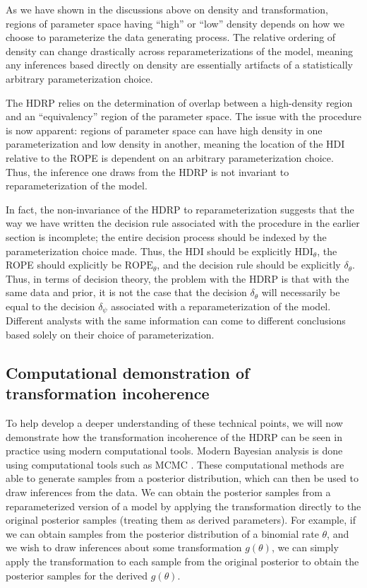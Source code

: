 \documentclass[man]{apa}
\newcommand{\hdr}{HDRP}
\begin{document}
As we have shown in the discussions above on density and transformation, regions of parameter space having ``high'' or ``low'' density depends on how we choose to parameterize the data generating process. The relative ordering of density can change drastically across reparameterizations of the model, meaning any inferences based directly on density are essentially artifacts of a statistically arbitrary parameterization choice. 

The \hdr{} relies on the determination of overlap between a high-density region and an ``equivalency'' region of the parameter space. The issue with the procedure is now apparent: regions of parameter space can have high density in one parameterization and low density in another, meaning the location of the HDI relative to the ROPE is dependent on an arbitrary parameterization choice.  Thus, the inference one draws from the \hdr{} is not invariant to reparameterization of the model. 

In fact, the non-invariance of the \hdr{} to reparameterization suggests that the way we have written the decision rule associated with the procedure in the earlier section is incomplete; the entire decision process should be indexed by the parameterization choice made. Thus, the HDI should be explicitly $\text{HDI}_\theta$, the ROPE should explicitly be $\text{ROPE}_\theta$, and the decision rule should be explicitly $\delta_\theta$. Thus, in terms of decision theory, the problem with the \hdr{} is that with the same data and prior, it is not the case that the decision $\delta_\theta$ will necessarily be equal to the decision $\delta_\psi$ associated with a reparameterization of the model. Different analysts with the same information can come to different conclusions based solely on their choice of parameterization.

\subsection{Computational demonstration of transformation incoherence}

To help develop a deeper understanding of these technical points, we will now demonstrate how the transformation incoherence of the \hdr{} can be seen in practice using modern computational tools. 
Modern Bayesian analysis is done using computational tools such as MCMC \cite{vanravenzwaaijSI}. These computational methods are able to generate samples from a posterior distribution, which can then be used to draw inferences from the data. We can obtain the posterior samples from a reparameterized version of a model by applying the transformation directly to the original posterior samples (treating them as derived parameters). For example, if we can obtain samples from the posterior distribution of a binomial rate $\theta$, and we wish to draw inferences about some transformation $g(\theta)$, we can simply apply the transformation to each sample from the original posterior to obtain the posterior samples for the derived $g(\theta)$. 
\end{document}
